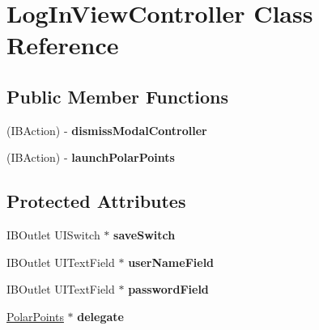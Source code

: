 \hypertarget{interface_log_in_view_controller}{
\section{LogInViewController Class Reference}
\label{interface_log_in_view_controller}
}
\subsection*{Public Member Functions}
\begin{DoxyCompactItemize}
\item 
\hypertarget{interface_log_in_view_controller_a29596c219d86ae5c5b450422782c7bd7}{
(IBAction) -\/ {\bfseries dismissModalController}}
\label{interface_log_in_view_controller_a29596c219d86ae5c5b450422782c7bd7}

\item 
\hypertarget{interface_log_in_view_controller_acb4d4d9f8746636dc3284d1097cbb190}{
(IBAction) -\/ {\bfseries launchPolarPoints}}
\label{interface_log_in_view_controller_acb4d4d9f8746636dc3284d1097cbb190}

\end{DoxyCompactItemize}
\subsection*{Protected Attributes}
\begin{DoxyCompactItemize}
\item 
\hypertarget{interface_log_in_view_controller_a7189c2464072197dc7c4a709c5854eb4}{
IBOutlet UISwitch $\ast$ {\bfseries saveSwitch}}
\label{interface_log_in_view_controller_a7189c2464072197dc7c4a709c5854eb4}

\item 
\hypertarget{interface_log_in_view_controller_ad70267e172870b81213cf510e3bc80c6}{
IBOutlet UITextField $\ast$ {\bfseries userNameField}}
\label{interface_log_in_view_controller_ad70267e172870b81213cf510e3bc80c6}

\item 
\hypertarget{interface_log_in_view_controller_aa6a62fda3b96a15b9d72e38033b262c8}{
IBOutlet UITextField $\ast$ {\bfseries passwordField}}
\label{interface_log_in_view_controller_aa6a62fda3b96a15b9d72e38033b262c8}

\item 
\hypertarget{interface_log_in_view_controller_ab66b9a29979122df5207647b0c59d753}{
\hyperlink{interface_polar_points}{PolarPoints} $\ast$ {\bfseries delegate}}
\label{interface_log_in_view_controller_ab66b9a29979122df5207647b0c59d753}

\end{DoxyCompactItemize}
